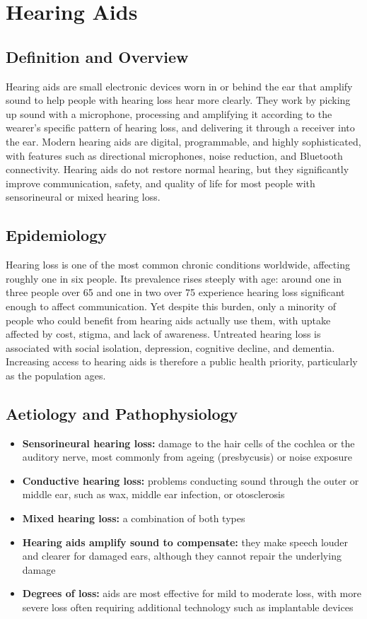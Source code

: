 \chapter{Hearing Aids}

\section*{Definition and Overview}
Hearing aids are small electronic devices worn in or behind the ear that amplify sound to help people with hearing loss hear more clearly. They work by picking up sound with a microphone, processing and amplifying it according to the wearer's specific pattern of hearing loss, and delivering it through a receiver into the ear. Modern hearing aids are digital, programmable, and highly sophisticated, with features such as directional microphones, noise reduction, and Bluetooth connectivity. Hearing aids do not restore normal hearing, but they significantly improve communication, safety, and quality of life for most people with sensorineural or mixed hearing loss.

\section*{Epidemiology}
Hearing loss is one of the most common chronic conditions worldwide, affecting roughly one in six people. Its prevalence rises steeply with age: around one in three people over 65 and one in two over 75 experience hearing loss significant enough to affect communication. Yet despite this burden, only a minority of people who could benefit from hearing aids actually use them, with uptake affected by cost, stigma, and lack of awareness. Untreated hearing loss is associated with social isolation, depression, cognitive decline, and dementia. Increasing access to hearing aids is therefore a public health priority, particularly as the population ages.

\section*{Aetiology and Pathophysiology}
\begin{itemize}
    \item \textbf{Sensorineural hearing loss:} damage to the hair cells of the cochlea or the auditory nerve, most commonly from ageing (presbycusis) or noise exposure
    \item \textbf{Conductive hearing loss:} problems conducting sound through the outer or middle ear, such as wax, middle ear infection, or otosclerosis
    \item \textbf{Mixed hearing loss:} a combination of both types
    \item \textbf{Hearing aids amplify sound to compensate:} they make speech louder and clearer for damaged ears, although they cannot repair the underlying damage
    \item \textbf{Degrees of loss:} aids are most effective for mild to moderate loss, with more severe loss often requiring additional technology such as implantable devices
\end{itemize}

